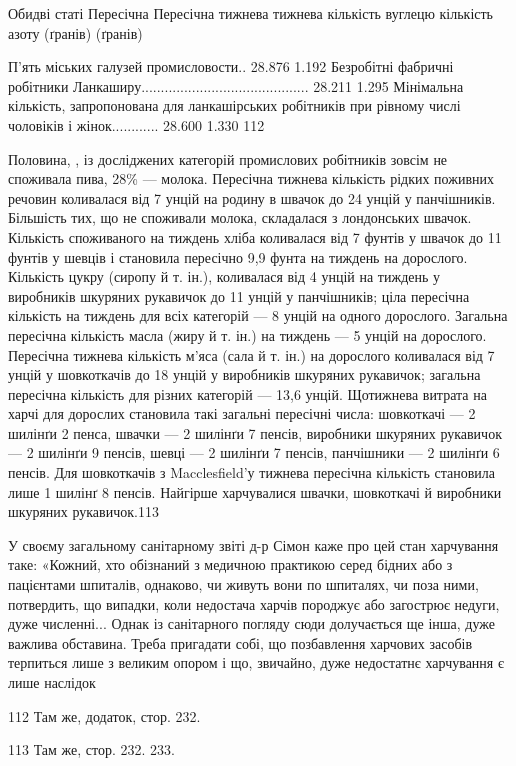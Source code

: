 Обидві статі                                                        Пересічна                       
       Пересічна
                                                                                тижнева             
                    тижнева
                                                                                кількість вуглецю   
            кількість азоту
                                                                                (ґранів)            
                      (ґранів)

П’ять міських галузей промисловости..     28.876                                      1.192
Безробітні фабричні робітники
Ланкаширу...........................................     28.211                                     
1.295
Мінімальна кількість, запропонована
для ланкашірських робітників при
рівному числі чоловіків і жінок............      28.600                                      1.330
112

Половина, , із досліджених категорій промислових робітників
зовсім не споживала пива, 28\% — молока. Пересічна
тижнева кількість рідких поживних речовин коливалася від
7 унцій на родину в швачок до 24 унцій у панчішників. Більшість
тих, що не споживали молока, складалася з лондонських
швачок. Кількість споживаного на тиждень хліба коливалася
від 7 фунтів у швачок до 11 фунтів у шевців і становила пересічно
9,9 фунта на тиждень на дорослого. Кількість цукру (сиропу
й т. ін.), коливалася від 4 унцій на тиждень у виробників
шкуряних рукавичок до 11 унцій у панчішників; ціла пересічна
кількість на тиждень для всіх категорій — 8 унцій на одного
дорослого. Загальна пересічна кількість масла (жиру й т. ін.)
на тиждень — 5 унцій на дорослого. Пересічна тижнева кількість
м’яса (сала й т. ін.) на дорослого коливалася від 7 унцій у шовкоткачів
до 18 унцій у виробників шкуряних рукавичок;
загальна пересічна кількість для різних категорій — 13,6 унцій.
Щотижнева витрата на харчі для дорослих становила такі загальні
пересічні числа: шовкоткачі — 2 шилінґи 2 пенса,
швачки — 2 шилінґи 7 пенсів, виробники шкуряних рукавичок
— 2 шилінґи 9 пенсів, шевці — 2 шилінґи 7 пенсів,
панчішники — 2 шилінґи 6 пенсів. Для шовкоткачів з Macclesfield’у
тижнева пересічна кількість становила лише 1 шилінґ
8 пенсів. Найгірше харчувалися швачки, шовкоткачі й виробники
шкуряних рукавичок.113

У своєму загальному санітарному звіті д-р Сімон каже про
цей стан харчування таке: «Кожний, хто обізнаний з медичною
практикою серед бідних або з пацієнтами шпиталів, однаково,
чи живуть вони по шпиталях, чи поза ними, потвердить, що випадки,
коли недостача харчів породжує або загострює недуги,
дуже численні... Однак із санітарного погляду сюди долучається
ще інша, дуже важлива обставина. Треба пригадати собі, що
позбавлення харчових засобів терпиться лише з великим опором
і що, звичайно, дуже недостатнє харчування є лише наслідок

112 Там же, додаток, стор. 232.

113 Там же, стор. 232. 233.
